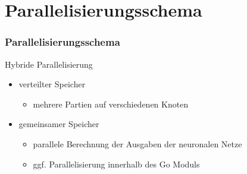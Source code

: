 \documentclass[compress]{beamer}
\begin{document}
\section{Parallelisierungsschema}
\begin{frame}
    \frametitle{Parallelisierungsschema}

    Hybride Parallelisierung
    \begin{itemize}
        \item verteilter Speicher
            \begin{itemize}
                \item mehrere Partien auf verschiedenen Knoten
            \end{itemize}
        \item gemeinsamer Speicher
            \begin{itemize}
                \item parallele Berechnung der Ausgaben der neuronalen Netze
                \item ggf. Parallelisierung innerhalb des Go Moduls
            \end{itemize}
    \end{itemize}
\end{frame}
\end{document}
